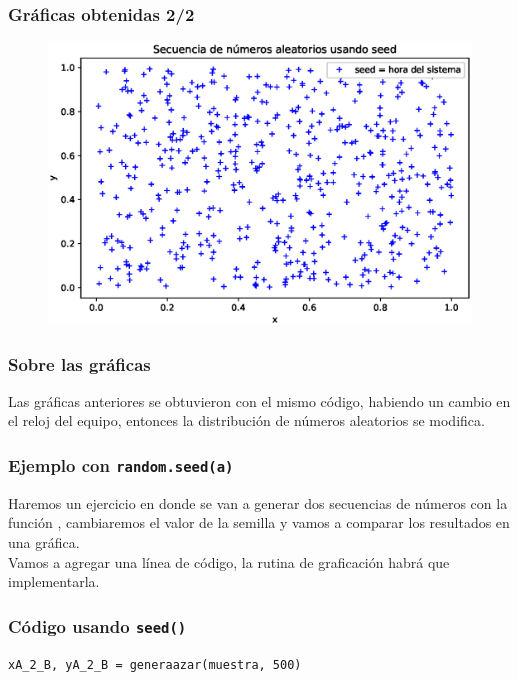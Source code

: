 \begin{frame}
\frametitle{Gráficas obtenidas 2/2}
\begin{figure}[h!]
  \centering
  \includegraphics[scale=0.5]{Imagenes/Secuencia_aleatoria_04.eps}
\end{figure}
\end{frame}
\begin{frame}
\frametitle{Sobre las gráficas}
Las gráficas anteriores se obtuvieron con el mismo código, habiendo un cambio en el reloj del equipo, entonces la distribución de números aleatorios se modifica.
\end{frame}
\begin{frame}
\frametitle{Ejemplo con \texttt{random.seed(a)}}
Haremos un ejercicio en donde se van a generar dos secuencias de números con la función , cambiaremos el valor de la semilla y vamos a comparar los resultados en una gráfica.
\\
\bigskip
Vamos a agregar una línea de código, la rutina de graficación habrá que implementarla.
\end{frame}
\begin{frame}
\frametitle{Código usando \texttt{seed()}}
\begin{lstlisting}[caption=Código con números generados con la hora del sistema y con semillas, style=codigopython]
xA_2_B, yA_2_B = generaazar(muestra, 500)
\end{lstlisting}
\end{frame}
